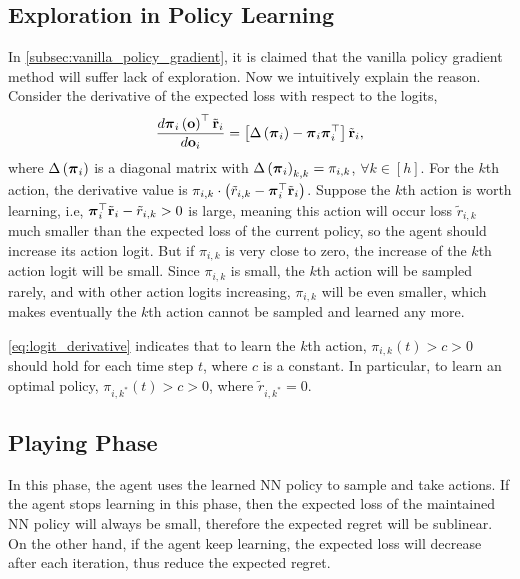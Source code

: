 \subsection{Exploration in Policy Learning}
\label{subsec:exploration_in_policy_learning}

In \cref{subsec:vanilla_policy_gradient}, it is claimed that the vanilla policy gradient method will suffer lack of exploration. Now we intuitively explain the reason. Consider the derivative of the expected loss with respect to the logits,
\begin{equation}
\label{eq:logit_derivative}
\begin{split}
    \frac{d {\boldsymbol{\pi}}_i\left( {\mathbf{o}} \right)^\top {\tilde{\mathbf{r}}}_i}{d {\mathbf{o}}_i} = \left[ \Delta\left( {\boldsymbol{\pi}}_i \right) - {\boldsymbol{\pi}}_i {\boldsymbol{\pi}}_i^\top \right] {\tilde{\mathbf{r}}}_i,
\end{split}
\end{equation}
where $\Delta\left( {\boldsymbol{\pi}}_i \right)$ is a diagonal matrix with $\Delta\left( {\boldsymbol{\pi}}_i \right)_{k,k} = \pi_{i,k}$, $\forall k \in [h]$. For the $k$th action, the derivative value is $\pi_{i,k} \cdot \left( \tilde{r}_{i,k} - {\boldsymbol{\pi}}_i^\top {\tilde{\mathbf{r}}}_i \right)$. Suppose the $k$th action is worth learning, i.e, ${\boldsymbol{\pi}}_i^\top {\tilde{\mathbf{r}}}_i - \tilde{r}_{i,k} > 0$ is large, meaning this action will occur loss $\tilde{r}_{i,k}$ much smaller than the expected loss of the current policy, so the agent should increase its action logit. But if $\pi_{i,k}$ is very close to zero, the increase of the $k$th action logit will be small. Since $\pi_{i,k}$ is small, the $k$th action will be sampled rarely, and with other action logits increasing, $\pi_{i,k}$ will be even smaller, which makes eventually the $k$th action cannot be sampled and learned any more.

\cref{eq:logit_derivative} indicates that to learn the $k$th action, $\pi_{i,k}(t) > c > 0$ should hold for each time step $t$, where $c$ is a constant. In particular, to learn an optimal policy, $\pi_{i,k^*}(t) > c > 0$, where $\tilde{r}_{i,k^*} = 0$.

\subsection{Playing Phase}
\label{subsec:playing_phase}

In this phase, the agent uses the learned NN policy to sample and take actions. If the agent stops learning in this phase, then the expected loss of the maintained NN policy will always be small, therefore the expected regret will be sublinear. On the other hand, if the agent keep learning, the expected loss will decrease after each iteration, thus reduce the expected regret.

